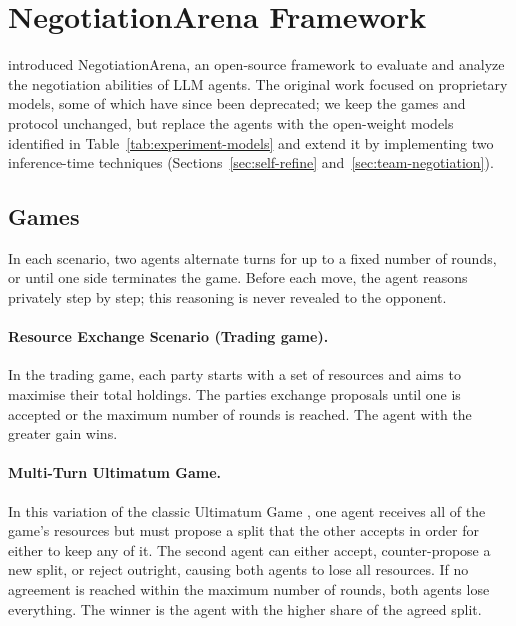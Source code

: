 \section{NegotiationArena Framework} \label{sec:na-framework}

\textcite{bianchi_how_2024} introduced NegotiationArena, an open-source framework to evaluate and analyze the negotiation abilities of LLM agents. The original work focused on proprietary models, some of which have since been deprecated; we keep the games and protocol unchanged, but replace the agents with the open-weight models identified in Table~\ref{tab:experiment-models} and extend it by implementing two inference-time techniques (Sections~\ref{sec:self-refine} and~\ref{sec:team-negotiation}). 

\subsection{Games} \label{sec:games}

In each scenario, two agents alternate turns for up to a fixed number of rounds, or until one side terminates the game. Before each move, the agent reasons privately step by step; this reasoning is never revealed to the opponent.

\paragraph{Resource Exchange Scenario (Trading game).}
In the trading game, each party starts with a set of resources and aims to maximise their total holdings. The parties exchange proposals until one is accepted or the maximum number of rounds is reached. The agent with the greater gain wins.

\paragraph{Multi-Turn Ultimatum Game.}
In this variation of the classic Ultimatum Game \cite{doi:10.1126/science.1082976}, one agent receives all of the game's resources but must propose a split that the other accepts in order for either to keep any of it. The second agent can either accept, counter-propose a new split, or reject outright, causing both agents to lose all resources. If no agreement is reached within the maximum number of rounds, both agents lose everything. The winner is the agent with the higher share of the agreed split.

